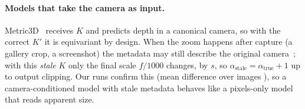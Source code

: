 \paragraph{Models that take the camera as input.}
Metric3D~\cite{yin2023metric3d,hu2024metric3dv2} receives $K$ and predicts depth in a canonical camera, so with
the correct $K'$ it is equivariant by design. When the zoom happens after capture (a gallery crop, a screenshot)
the metadata may still describe the original camera~\cite{kim2026mismatch}; with this \emph{stale} $K$ only the
final scale $f/1000$ changes, by $s$, so $\alpha_{\text{stale}}=\alpha_{\text{true}}+1$ up to output clipping. Our runs confirm this (mean difference over \staleImages{} images
\staleDiffMean), so a camera-conditioned model with stale metadata behaves like a pixels-only model that
reads apparent size.
